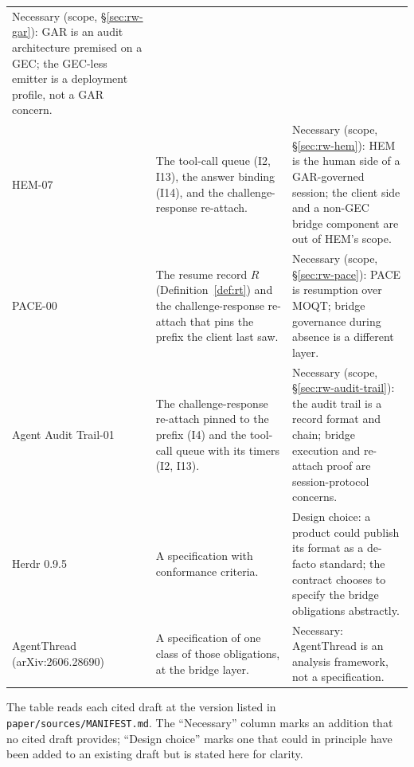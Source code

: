 \begin{table}[htbp]
\begin{tabularx}{\columnwidth}{l X X}
Necessary (scope, §\ref{sec:rw-gar}): GAR is an audit architecture premised on a GEC; the GEC-less emitter is a deployment profile, not a GAR concern. \\
HEM-07 &
The tool-call queue (I2, I13), the answer binding (I14), and the
challenge-response re-attach. &
Necessary (scope, §\ref{sec:rw-hem}): HEM is the human side of a GAR-governed session; the client side and a non-GEC bridge component are out of HEM's scope. \\
PACE-00 &
The resume record $R$ (Definition~\ref{def:rt}) and the
challenge-response re-attach that pins the prefix the client last saw. &
Necessary (scope, §\ref{sec:rw-pace}): PACE is resumption over MOQT; bridge governance during absence is a different layer. \\
Agent Audit Trail-01 &
The challenge-response re-attach pinned to the prefix (I4) and the
tool-call queue with its timers (I2, I13). &
Necessary (scope, §\ref{sec:rw-audit-trail}): the audit trail is a record format and chain; bridge execution and re-attach proof are session-protocol concerns. \\
Herdr 0.9.5 &
A specification with conformance criteria. &
Design choice: a product could publish its format as a de-facto
standard; the contract chooses to specify the bridge obligations
abstractly. \\
AgentThread (arXiv:2606.28690) &
A specification of one class of those obligations, at the bridge layer. &
Necessary: AgentThread is an analysis framework, not a specification. \\
\bottomrule
\end{tabularx}
\end{table}

The table reads each cited draft at the version listed in
\texttt{paper/sources/MANIFEST.md}. The ``Necessary'' column marks an
addition that no cited draft provides; ``Design choice'' marks one that
could in principle have been added to an existing draft but is stated
here for clarity.
